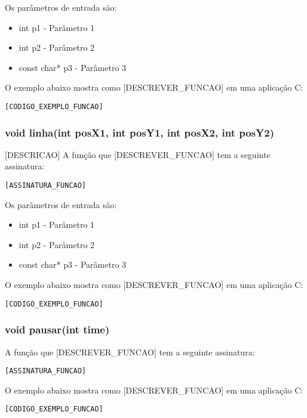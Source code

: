 \documentclass[12pt, %
openright,
oneside, %
a4paper,    %
brazil]{facom-ufu-abntex2}
\begin{document}
Os parâmetros de entrada são:

\begin{itemize}
    \item int p1 - Parâmetro 1
    \item int p2 - Parâmetro 2
    \item const char* p3 - Parâmetro 3
\end{itemize}

O exemplo abaixo mostra como [DESCREVER_FUNCAO] em uma aplicação C:

\begin{lstlisting}
[CODIGO_EXEMPLO_FUNCAO]
\end{lstlisting}

\subsubsection{void linha(int posX1, int posY1, int posX2, int posY2)}
[DESCRICAO]
A função que [DESCREVER_FUNCAO] tem a seguinte assinatura:

\begin{lstlisting}
[ASSINATURA_FUNCAO]
\end{lstlisting}

Os parâmetros de entrada são:

\begin{itemize}
    \item int p1 - Parâmetro 1
    \item int p2 - Parâmetro 2
    \item const char* p3 - Parâmetro 3
\end{itemize}

O exemplo abaixo mostra como [DESCREVER_FUNCAO] em uma aplicação C:

\begin{lstlisting}
[CODIGO_EXEMPLO_FUNCAO]
\end{lstlisting}


\subsubsection{void pausar(int time)}
A função que [DESCREVER_FUNCAO] tem a seguinte assinatura:

\begin{lstlisting}
[ASSINATURA_FUNCAO]
\end{lstlisting}

O exemplo abaixo mostra como [DESCREVER_FUNCAO] em uma aplicação C:

\begin{lstlisting}
[CODIGO_EXEMPLO_FUNCAO]
\end{lstlisting}
\end{document}
